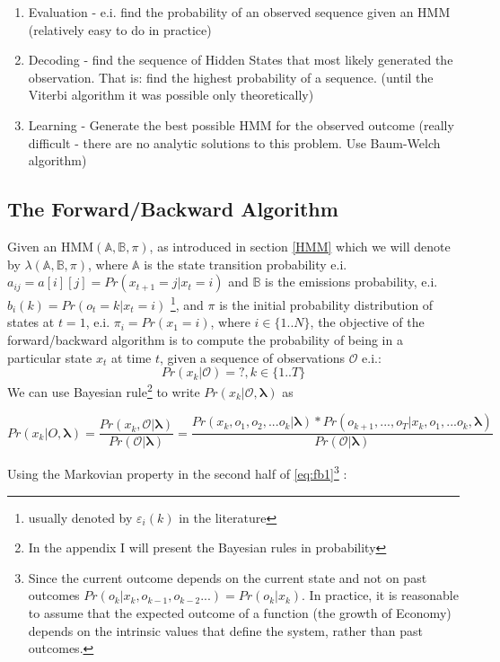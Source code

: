 \documentclass[a4paper,12pt]{article}
\theoremstyle{definition}
\begin{document}
\begin{enumerate}
\item{Evaluation} - e.i. find the probability of an observed sequence given an HMM (relatively easy to do in practice)
\item{Decoding} - find the sequence of Hidden States that most likely generated the observation. That is: find the highest probability of a sequence. (until the Viterbi algorithm it was possible only theoretically)
\item{Learning} - Generate the best possible HMM for the observed outcome (really difficult - there are no analytic solutions to this problem. Use Baum-Welch algorithm)

\end{enumerate}



\subsection{The Forward/Backward Algorithm}\label{sec:FBA}
Given an HMM$(\mathbb{A}, \mathbb{B}, \pi)$, as introduced in section \ref{HMM} which we will denote by $\lambda(\mathbb{A}, \mathbb{B}, \pi)$, where $\mathbb{A}$ is the state transition probability e.i. $a_{ij}=a[i][j]=Pr(x_{t+1}=j|x_t=i)$  and $\mathbb{B}$ is the emissions probability, e.i. $b_i(k) = Pr(o_t = k|x_t=i)$ \footnote{ usually denoted by $\varepsilon_i(k)$ in the literature}, and $\pi$ is the initial probability distribution of states at $t=1$, e.i. $\pi_i = Pr(x_1=i)$, where $i \in \{1..N\}$, the objective of the forward/backward algorithm is to compute the probability of being in a particular state $x_t$ at time $t$, given a sequence of observations $\mathcal{O}$ e.i.:
\[ Pr(x_k | \mathcal{O})= ? , k \in \{1..T \} \] 
We can use Bayesian rule\footnote{In the appendix I will present the Bayesian rules in probability} to write $Pr(x_k | \mathcal{O} , \mathbf{\lambda})$ as 

\begin{equation}\label{eq:fb1}
Pr(x_k | O, \mathbf{\lambda}) =  \frac{Pr(x_k, \mathcal{O} | \mathbf{\lambda})}{Pr(\mathcal{O}|\mathbf{\lambda})} = \frac{Pr(x_k,o_1,o_2,...o_k |\mathbf{\lambda} )*Pr(o_{k+1},...,o_T|x_k,o_1,...o_k,\mathbf{\lambda})}{Pr(\mathcal{O}|\mathbf{\lambda})}
\end{equation}

Using the Markovian property in the second half of \ref{eq:fb1}\footnote{Since the current outcome depends on the current state and not on past outcomes $Pr(o_k|x_k,o_{k-1},o_{k-2}...) =Pr(o_k|x_k) $. In practice, it is reasonable to assume that the expected outcome of a function (the growth of Economy) depends on the intrinsic values that define the system, rather than past outcomes. } :
\end{document}
